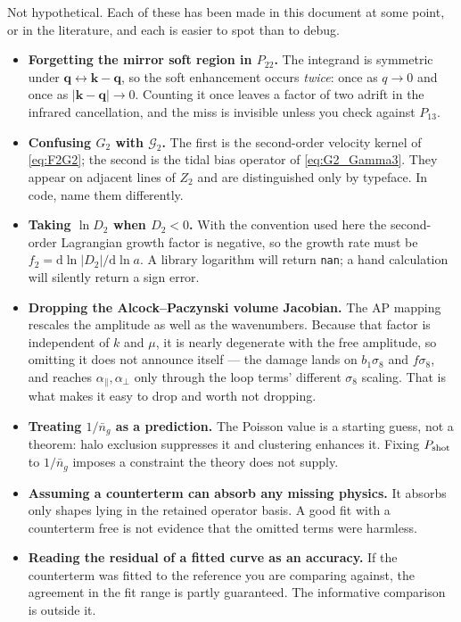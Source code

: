 \documentclass[a4paper,11pt]{article}
\newcommand{\vq}{\bm{q}}
\newcommand{\vk}{\bm{k}}
\newcommand{\dd}{\mathrm{d}}
\def\G{\mathcal{G}}
\begin{document}
Not hypothetical. Each of these has been made in this document at some point,
or in the literature, and each is easier to spot than to debug.

\begin{itemize}[itemsep=3pt,topsep=2pt]

\item \textbf{Forgetting the mirror soft region in $P_{22}$.} The integrand is
symmetric under $\vq \leftrightarrow \vk-\vq$, so the soft enhancement occurs
\emph{twice}: once as $q\to0$ and once as $|\vk-\vq|\to0$. Counting it once
leaves a factor of two adrift in the infrared cancellation, and the miss is
invisible unless you check against $P_{13}$.

\item \textbf{Confusing $G_2$ with $\G_2$.} The first is the second-order
velocity kernel of \eqref{eq:F2G2}; the second is the tidal bias operator of
\eqref{eq:G2_Gamma3}. They appear on adjacent lines of $Z_2$ and are
distinguished only by typeface. In code, name them differently.

\item \textbf{Taking $\ln D_2$ when $D_2 < 0$.} With the convention used here
the second-order Lagrangian growth factor is negative, so the growth rate must
be $f_2 = \dd\ln|D_2|/\dd\ln a$. A library logarithm will return \texttt{nan};
a hand calculation will silently return a sign error.

\item \textbf{Dropping the Alcock--Paczynski volume Jacobian.} The AP mapping
rescales the amplitude as well as the wavenumbers. Because that factor is
independent of $k$ and $\mu$, it is nearly degenerate with the free amplitude,
so omitting it does not announce itself --- the damage lands on $b_1\sigma_8$
and $f\sigma_8$, and reaches $\alpha_\parallel,\alpha_\perp$ only through the
loop terms' different $\sigma_8$ scaling. That is what makes it easy to drop and
worth not dropping.

\item \textbf{Treating $1/\bar n_g$ as a prediction.} The Poisson value is a
starting guess, not a theorem: halo exclusion suppresses it and clustering
enhances it. Fixing $P_{\rm shot}$ to $1/\bar n_g$ imposes a constraint the
theory does not supply.

\item \textbf{Assuming a counterterm can absorb any missing physics.} It absorbs
only shapes lying in the retained operator basis. A good fit with a counterterm
free is not evidence that the omitted terms were harmless.

\item \textbf{Reading the residual of a fitted curve as an accuracy.} If the
counterterm was fitted to the reference you are comparing against, the agreement
in the fit range is partly guaranteed. The informative comparison is outside it.

\end{itemize}
\end{document}
